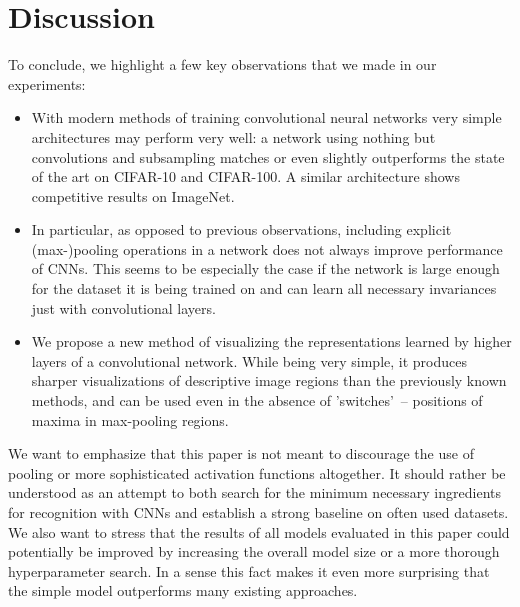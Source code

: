 \documentclass{article} \usepackage{iclr2015,times}
\begin{document}
\section{Discussion}
To conclude, we highlight a few key observations that we made
in our experiments:
\begin{itemize}
 \item With modern methods of training convolutional neural networks very simple architectures may perform very well: a network using nothing but convolutions and subsampling matches or even slightly outperforms the state of the art on CIFAR-10 and CIFAR-100. A similar architecture shows competitive results on ImageNet.
 \item In particular, as opposed to previous observations, including explicit (max-)pooling operations in a network does not always improve performance of CNNs. This seems to be especially the case if the network is large enough for the dataset it is being trained on and can learn all necessary invariances just with convolutional layers.
 \item We propose a new method of visualizing the representations learned by higher layers of a convolutional network. While being very simple, it produces sharper visualizations of descriptive image regions than the previously known methods, and can be used even in the absence of 'switches'~-- positions of maxima in max-pooling regions.
\end{itemize}
We want to emphasize that this paper is not meant to discourage the use of pooling or more sophisticated activation functions altogether. It should rather be understood as an attempt to both search for the minimum necessary ingredients for  recognition with CNNs and establish a strong baseline on often used datasets. 
We also want to stress that the results of all models evaluated in this paper could potentially be improved by increasing the overall model size or a more thorough hyperparameter search. In a sense this fact makes it even more surprising that the simple model outperforms many existing approaches. 
\end{document}
